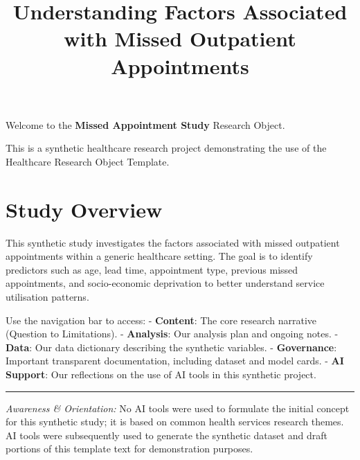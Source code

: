 \documentclass[
]{report}
\title{Understanding Factors Associated with Missed Outpatient
Appointments}
\author{}
\date{}
\renewcommand*\contentsname{Table of contents}
\newcommand\contentsname{Table of contents}
\begin{document}
\maketitle

\renewcommand*\contentsname{Table of contents}
{
\hypersetup{linkcolor=}
\setcounter{tocdepth}{2}
\tableofcontents
}

Welcome to the \textbf{Missed Appointment Study} Research Object.

This is a synthetic healthcare research project demonstrating the use of
the Healthcare Research Object Template.

\chapter{Study Overview}\label{study-overview}

This synthetic study investigates the factors associated with missed
outpatient appointments within a generic healthcare setting. The goal is
to identify predictors such as age, lead time, appointment type,
previous missed appointments, and socio-economic deprivation to better
understand service utilisation patterns.

Use the navigation bar to access: - \textbf{Content}: The core research
narrative (Question to Limitations). - \textbf{Analysis}: Our analysis
plan and ongoing notes. - \textbf{Data}: Our data dictionary describing
the synthetic variables. - \textbf{Governance}: Important transparent
documentation, including dataset and model cards. - \textbf{AI Support}:
Our reflections on the use of AI tools in this synthetic project.

\begin{center}\rule{0.5\linewidth}{0.5pt}\end{center}

\begin{tcolorbox}[enhanced jigsaw, left=2mm, colframe=quarto-callout-note-color-frame, toptitle=1mm, leftrule=.75mm, bottomtitle=1mm, coltitle=black, colbacktitle=quarto-callout-note-color!10!white, opacitybacktitle=0.6, opacityback=0, title=\textcolor{quarto-callout-note-color}{\faInfo}\hspace{0.5em}{AI Capability Checkpoint}, rightrule=.15mm, arc=.35mm, titlerule=0mm, bottomrule=.15mm, toprule=.15mm, colback=white, breakable]

\emph{Awareness \& Orientation:} No AI tools were used to formulate the
initial concept for this synthetic study; it is based on common health
services research themes. AI tools were subsequently used to generate
the synthetic dataset and draft portions of this template text for
demonstration purposes.

\end{tcolorbox}
\end{document}
